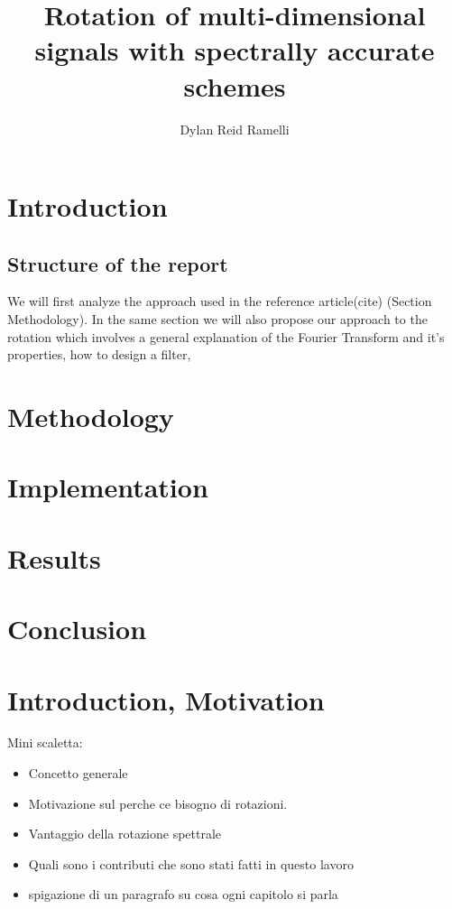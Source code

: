 \documentclass[]{usiinfbachelorproject}
\title{Rotation of multi-dimensional signals with spectrally accurate schemes}
\author{Dylan Reid Ramelli}
\begin{document}
	
	\section{Introduction}
	
	\subsection{Structure of the report}
	We will first analyze the approach used in the reference article(cite) (Section Methodology). In the same section we will also propose our approach to the rotation which involves a general explanation of the Fourier Transform and it's properties, how to design a filter, 
	\section{Methodology}
	
	\section{Implementation}
	
	\section{Results}
	
	\section{Conclusion}
	  
	
	
	
	
	
	
	
	
	
	
	
	
	
	
	
	
	
	
	\maketitle
		
		
	\tableofcontents
	\newpage
	\section{Introduction, Motivation}\label{introduction}
	
	
	Mini scaletta:
	\begin{itemize}
		\item Concetto generale
		\item Motivazione sul perche ce bisogno di rotazioni.
		\item Vantaggio della rotazione spettrale
		\item Quali sono i contributi  che sono stati fatti in questo lavoro
		\item spigazione di un paragrafo su cosa ogni capitolo si parla
	\end{itemize}
	
\end{document}
